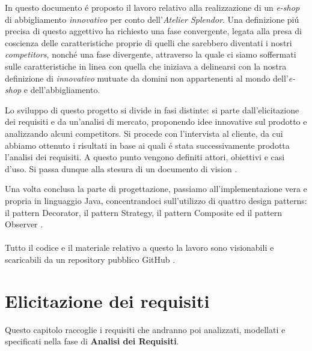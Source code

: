 \documentclass[12pt]{article}
\begin{document}
\newpage

\tableofcontents


\newpage

\abstract{}
In questo documento \'e proposto il lavoro relativo alla realizzazione di un \textit{e-shop} di abbigliamento \textit{innovativo} per conto dell'{\em Atelier Splendor}. Una definizione pi\'u precisa di questo aggettivo ha richiesto una fase convergente, legata alla presa di coscienza delle caratteristiche proprie di quelli che sarebbero diventati i nostri \textit{competitors}, nonch\'e una fase divergente, attraverso la quale ci siamo soffermati sulle caratteristiche in linea con quella che iniziava a delinearsi con la nostra definizione di \textit{innovativo} mutuate da domini non appartenenti al mondo dell'\textit{e-shop} e dell'abbigliamento.

Lo sviluppo di questo progetto si divide in fasi distinte: si parte dall'elicitazione dei requisiti \cite{elicitation_tools} e da un'analisi di mercato, proponendo idee innovative sul prodotto e analizzando alcuni competitors. Si procede con l'intervista al cliente, da cui abbiamo ottenuto i risultati in base ai quali \'e stata successivamente prodotta l'analisi dei requisiti. A questo punto vengono definiti attori, obiettivi e casi d'uso. Si passa dunque alla stesura di un documento di vision \cite{up-riferimento}.

Una volta conclusa la parte di progettazione, passiamo all'implementazione vera e propria in linguaggio Java, concentrandoci sull'utilizzo di quattro design patterns: il pattern Decorator, il pattern Strategy, il pattern Composite ed il pattern Observer \cite{gof_sunt}.
\\
\\

Tutto il codice e il materiale relativo a questo la lavoro sono visionabili e scaricabili da un repository pubblico GitHub \cite{github}.

\newpage

\section{Elicitazione dei requisiti}
Questo capitolo raccoglie i requisiti che andranno poi analizzati, modellati e specificati nella fase di \textbf{Analisi dei Requisiti}. 
\end{document}
